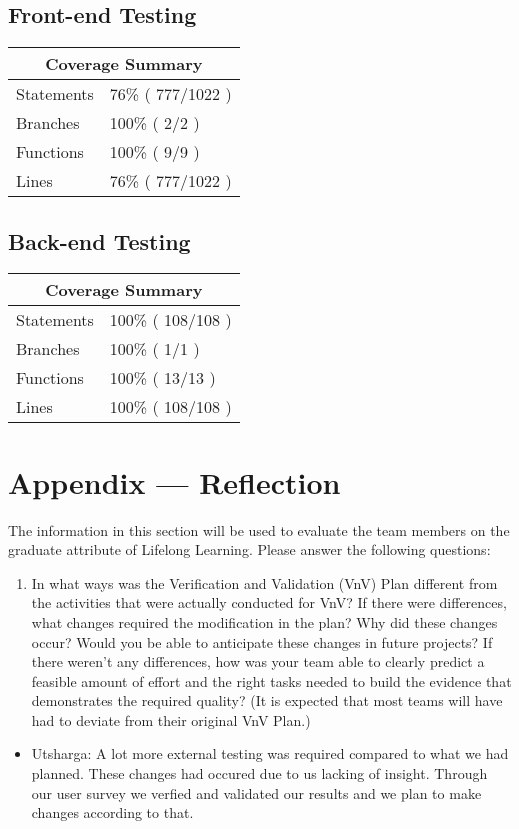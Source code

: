 \documentclass[12pt, titlepage]{article}
\begin{document}
\subsection{Front-end Testing}

\begin{tabular}{ |p{6cm}|p{6cm}|  }
 \hline
 \multicolumn{2}{|c|}{Coverage Summary} \\
 \hline
Statements   & 76\% ( 777/1022 )   \\ \hline
Branches   & 100\% ( 2/2 )  \\ \hline
Functions  & 100\%  ( 9/9 )  \\ \hline
Lines   & 76\% ( 777/1022 ) \\ \hline
\end{tabular}

\subsection{Back-end Testing}

\begin{tabular}{ |p{6cm}|p{6cm}|  }
 \hline
 \multicolumn{2}{|c|}{Coverage Summary} \\
 \hline
Statements   & 100\% ( 108/108 )   \\ \hline
Branches   & 100\% ( 1/1 )  \\ \hline
Functions  & 100\%  ( 13/13 )  \\ \hline
Lines   & 100\% ( 108/108 ) \\ \hline
\end{tabular}




\newpage{}
\section*{Appendix --- Reflection}

The information in this section will be used to evaluate the team members on the
graduate attribute of Lifelong Learning.  Please answer the following questions:

\begin{enumerate}
  \item In what ways was the Verification and Validation (VnV) Plan different from the activities that were actually conducted for VnV? If there were differences, what changes required the modification in the plan? Why did these changes occur? Would you be able to anticipate these changes in future projects? If there weren't any differences, how was your team able to clearly predict a feasible amount of effort and the right tasks needed to build the evidence that demonstrates the required quality? (It is expected that most teams will have had to deviate from their original VnV Plan.)  
\end{enumerate}

\begin{itemize}
\item Utsharga: A lot more external testing was required compared to what we had planned. These changes had occured due to us lacking of insight. Through our user survey we verfied and validated our results and we plan to make changes according to that.
\end{itemize}
\end{document}
